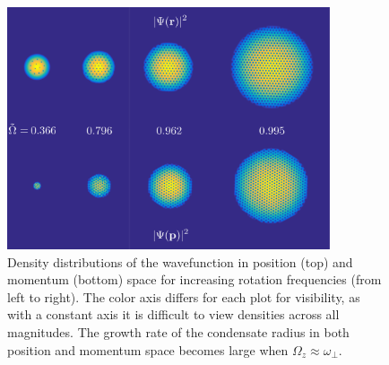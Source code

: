 \begin{figure}\centering
    \includegraphics[width=0.85\textwidth]{Images/ch4_vtx/ramp_omega_2.pdf}
    \caption{Density distributions of the wavefunction in position (top) and momentum (bottom) space for increasing rotation frequencies (from left to right). The color axis differs for each plot for visibility, as with a constant axis it is difficult to view densities across all magnitudes. The growth rate of the condensate radius in both position and momentum space becomes large when $\Omega_z \approx \omega_\perp$.}
    \label{fig:inc_omega}
\end{figure}


